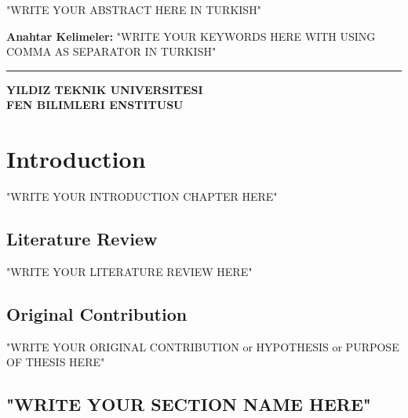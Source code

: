 \documentclass[12pt]{report}
\begin{document}
\begin{singlespacing}
"WRITE YOUR ABSTRACT HERE IN TURKISH"

\vspace{2.5cm}
\textbf{Anahtar Kelimeler:} "WRITE YOUR KEYWORDS HERE WITH USING COMMA AS SEPARATOR IN TURKISH"
\end{singlespacing}

\vspace{1ex}
\hrule
\begin{flushright}
\textbf{YILDIZ TEKNIK UNIVERSITESI \\ FEN BILIMLERI ENSTITUSU}
\end{flushright}

\newpage
{}

\chapter{Introduction} %
"WRITE YOUR INTRODUCTION CHAPTER HERE"

\section{Literature Review} %
\label{sec: literature review}
"WRITE YOUR LITERATURE REVIEW HERE"

\section{Original Contribution} %
\label{sec: original}
"WRITE YOUR ORIGINAL CONTRIBUTION or HYPOTHESIS or PURPOSE OF THESIS HERE"

\section{"WRITE YOUR SECTION NAME HERE"}
\label{sec: "WRITE YOUR SECTION LABEL HERE"}
\end{document}
